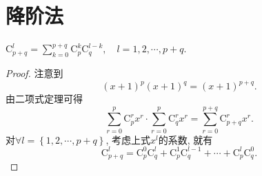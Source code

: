 \documentclass[../../main.tex]{subfiles}%
\begin{document}
\section{降阶法}

\begin{theorem}[Vandermode恒等式]\label{theorem:Vandermode恒等式}
$\mathrm{C}_{p+q}^{l}=\sum_{k=0}^{p+q}{\mathrm{C}_{p}^{k}\mathrm{C}_{q}^{l-k}},\quad l=1,2,\cdots,p+q.$
\end{theorem}
\begin{proof}
注意到
\[
\left( x+1 \right) ^p\left( x+1 \right) ^q=\left( x+1 \right) ^{p+q}.
\]
由二项式定理可得
\[
\sum_{r=0}^p{\mathrm{C}_{p}^{r}x^r}\cdot \sum_{r=0}^p{\mathrm{C}_{q}^{r}x^r}=\sum_{r=0}^{p+q}{\mathrm{C}_{p+q}^{r}x^r}.
\]
对$\forall l=\left\{ 1,2,\cdots ,p+q \right\}$, 考虑上式$x^l$的系数, 就有
\[
\mathrm{C}_{p+q}^{l}=\mathrm{C}_{p}^{0}\mathrm{C}_{q}^{l}+\mathrm{C}_{p}^{1}\mathrm{C}_{q}^{l-1}+\cdots +\mathrm{C}_{p}^{l}\mathrm{C}_{q}^{0}.
\]
\end{proof}
\end{document}
